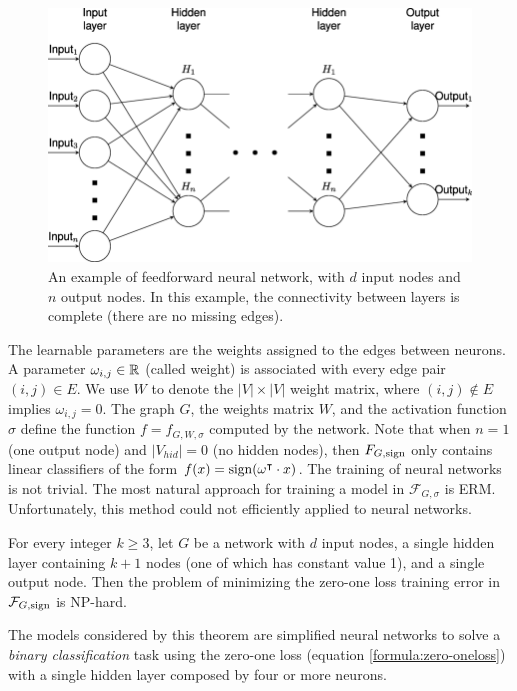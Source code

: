 \begin{figure}[h!]
	\centering
	\includegraphics[width=0.9\linewidth]{images/mlp.png}
	\caption{An example of feedforward neural network, with $d$ input nodes and $n$ output nodes. In this example, the connectivity between layers is complete (there are no missing edges).}
\end{figure}

The learnable parameters are the weights assigned to the edges between neurons. 
A parameter $\omega_{i,j} \in \mathbb{R}$ (called weight) is associated with every edge pair $(i, j) \in E$.  We use $W$ to denote the $|V | \times |V |$ weight matrix, where $(i, j) \notin E$ implies $\omega_{i,j} = 0$. The graph $G$, the weights matrix
$W$, and the activation function $\sigma$ define the function $f = f_{G,W,\sigma}$ computed by the network.  Note that when $n = 1$ (one output node) and $|V_{hid}| = 0$ (no hidden nodes), then $F_{G,\operatorname{sign}}$ only contains linear classifiers of the form $f(x) = \operatorname{sign}(\omega^\intercal \cdot x)$. The training of neural networks is not trivial. The most natural approach for training a model in $\mathcal{F}_{G,\sigma}$ is ERM.
Unfortunately, this method could not efficiently applied to neural networks. 

\begin{theorem}
	For every integer $k \geq 3$, let $G$ be a network with $d$ input nodes, a single hidden layer containing $k + 1$ nodes (one of which has constant value 1), and a single output node. Then the problem of minimizing the zero-one loss training error in $\mathcal{F}_{G,\operatorname{sign}}$ is NP-hard. 
\end{theorem}

The models considered by this theorem are simplified neural networks to solve a \textit{binary classification} task using the zero-one loss (equation \ref{formula:zero-oneloss}) with a single hidden layer composed by four or more neurons. 


